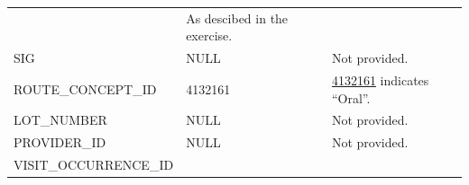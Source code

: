 \documentclass[11pt]{book}
\theoremstyle{definition}
\theoremstyle{definition}
\theoremstyle{definition}
\theoremstyle{remark}
\begin{document}
\begin{longtable}[]{@{}lll@{}}
\begin{minipage}[t]{0.15\columnwidth}
\end{minipage} & \begin{minipage}[t]{0.49\columnwidth}\raggedright
As descibed in the exercise.\strut
\end{minipage}\tabularnewline
\begin{minipage}[t]{0.28\columnwidth}\raggedright
SIG\strut
\end{minipage} & \begin{minipage}[t]{0.15\columnwidth}\raggedright
NULL\strut
\end{minipage} & \begin{minipage}[t]{0.49\columnwidth}\raggedright
Not provided.\strut
\end{minipage}\tabularnewline
\begin{minipage}[t]{0.28\columnwidth}\raggedright
ROUTE\_CONCEPT\_ID\strut
\end{minipage} & \begin{minipage}[t]{0.15\columnwidth}\raggedright
4132161\strut
\end{minipage} & \begin{minipage}[t]{0.49\columnwidth}\raggedright
\href{http://athena.ohdsi.org/search-terms/terms/4132161}{4132161} indicates ``Oral''.\strut
\end{minipage}\tabularnewline
\begin{minipage}[t]{0.28\columnwidth}\raggedright
LOT\_NUMBER\strut
\end{minipage} & \begin{minipage}[t]{0.15\columnwidth}\raggedright
NULL\strut
\end{minipage} & \begin{minipage}[t]{0.49\columnwidth}\raggedright
Not provided.\strut
\end{minipage}\tabularnewline
\begin{minipage}[t]{0.28\columnwidth}\raggedright
PROVIDER\_ID\strut
\end{minipage} & \begin{minipage}[t]{0.15\columnwidth}\raggedright
NULL\strut
\end{minipage} & \begin{minipage}[t]{0.49\columnwidth}\raggedright
Not provided.\strut
\end{minipage}\tabularnewline
\begin{minipage}[t]{0.28\columnwidth}\raggedright
VISIT\_OCCURRENCE\_ID\strut
\end{minipage} & \begin{minipage}[t]{0.15\columnwidth}\raggedright

\end{minipage}
\end{longtable}
\end{document}
